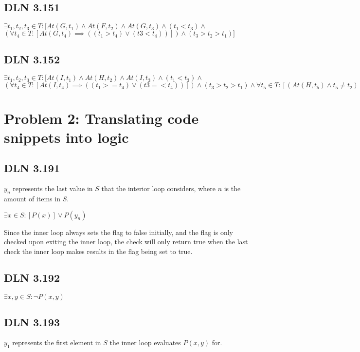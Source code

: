 \documentclass[titlepage]{article}
\begin{document}
\subsection{DLN 3.151}

\( \exists t_1, t_2, t_3 \in T: [ At(G, t_1) \land At(F, t_2) \land At(G, t_3) \land (t_1 < t_3) \land\) \( (\forall t_4 \in T:[At(G, t_4) \implies ((t_1 > t_4) \lor (t3 < t_4))]) \land (t_3 > t_2 > t_1)] \)

\subsection{DLN 3.152} 

\( \exists t_1, t_2, t_3 \in T: [ At(I, t_1) \land At(H, t_2) \land At(I, t_3) \land (t_1 < t_3) \land\) \( (\forall t_4 \in T:[At(I, t_4) \implies ((t_1 >= t_4) \lor (t3 =< t_4))]) \land (t_3 > t_2 > t_1) \land \forall t_5 \in T:[(At(H, t_5) \land t_5 \neq t_2) \implies \lnot (t_3 > t_5 > t_1)] ] \)

\section{Problem 2: Translating code snippets into logic}

\subsection{DLN 3.191}

$y_n$ represents the last value in $S$ that the interior loop considers, where $n$ is the amount of items in $S$.

\( \exists x \in S: [P(x)] \lor P(y_n) \)

Since the inner loop always sets the flag to false initially, and the flag is only checked upon exiting the inner loop, the check will only return true when the last check the inner loop makes results in the flag being set to true.

\subsection{DLN 3.192}

\( \exists x, y \in S: \lnot P(x,y) \)

\subsection{DLN 3.193}

$y_1$ represents the first element in $S$ the inner loop evaluates $P(x,y)$ for.
\end{document}
